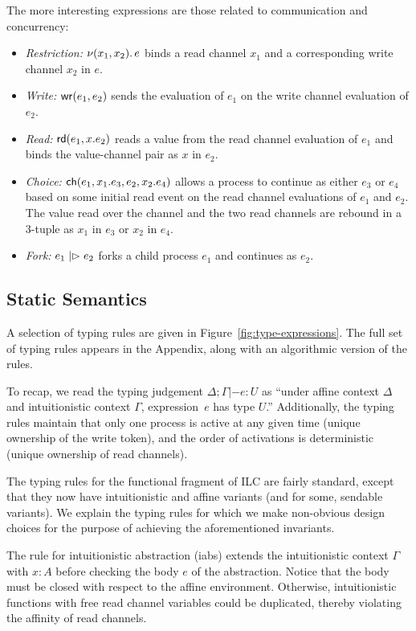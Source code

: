 The more interesting expressions are those related to communication and
concurrency:
\begin{itemize}[leftmargin=*]
  \item \emph{Restriction:} $\nu(x_1, x_2).\,e$ binds a read channel $x_1$ and
    a corresponding write channel $x_2$ in $e$.
  \item \emph{Write:} $\textnormal{\textsf{wr}}\mathsf{(}{e_1},{e_2}\mathsf{)}$ sends the evaluation of $e_1$ on
    the write channel evaluation of $e_2$.
  \item \emph{Read:} $\textnormal{\textsf{rd}}\mathsf{(}{e_1},{x}.{e_2}\mathsf{)}$ reads a value from the read channel
    evaluation of $e_1$ and binds the value-channel pair as $x$ in $e_2$.
  \item \emph{Choice:} $\textnormal{\textsf{ch}}\mathsf{(}{e_1},{x_1}.{e_3},{e_2},{x_2}.{e_4}\mathsf{)}$ allows a
    process to continue as either $e_3$ or $e_4$ based on some initial read
    event on the read channel evaluations of $e_1$ and $e_2$. The value read
    over the channel and the two read channels are rebound in a 3-tuple as $x_1$
    in $e_3$ or $x_2$ in $e_4$.
  \item \emph{Fork:} $e_1 \mathrel{|\rhd} e_2$ forks a child process $e_1$ and
    continues as $e_2$.
\end{itemize}

\subsection{Static Semantics}
\label{subsec:types}

A selection of typing rules are given in Figure~\ref{fig:type-expressions}. The
full set of typing rules appears in the Appendix, along with an algorithmic
version of the rules.

To recap, we read the typing judgement $\Delta; \Gamma |- e : U$ as ``under affine context
$\Delta$ and intuitionistic context $\Gamma$, expression~$e$ has type $U$.'' Additionally,
the typing rules maintain that only one process is active at any given time
(unique ownership of the write token), and the order of activations is
deterministic (unique ownership of read channels).

The typing rules for the functional fragment of ILC are fairly standard, except
that they now have intuitionistic and affine variants (and for some, sendable
variants). We explain the typing rules for which we make non-obvious design
choices for the purpose of achieving the aforementioned invariants.

The rule for intuitionistic abstraction (iabs) extends the intuitionistic
context $\Gamma$ with $x : A$ before checking the body $e$ of the abstraction. Notice
that the body must be closed with respect to the affine environment. Otherwise,
intuitionistic functions with free read channel variables could be duplicated,
thereby violating the affinity of read channels.

